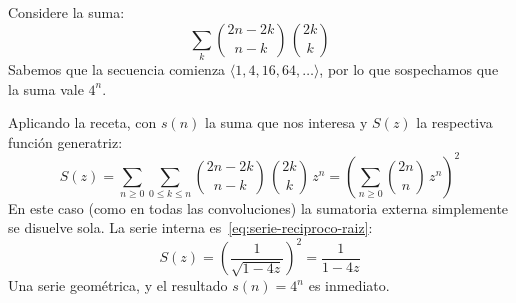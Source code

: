   \begin{example}
    Considere la suma:
    \begin{equation*}
      \sum_k \binom{2 n - 2 k}{n - k} \, \binom{2 k}{k}
    \end{equation*}
    Sabemos que la secuencia
    comienza \(\langle 1, 4, 16, 64, \dotsc\rangle\),
    por lo que sospechamos que la suma vale \(4^n\).

    Aplicando la receta,
    con \(s(n)\) la suma que nos interesa
    y \(S(z)\) la respectiva función generatriz:
    \begin{equation*}
      S(z)
	= \sum_{n \ge 0}
	    \sum_{0 \le k \le n}
	      \binom{2 n - 2 k}{n - k} \, \binom{2 k}{k} \, z^n
	= \left( \sum_{n \ge 0} \binom{2 n}{n} \, z^n \right)^2
    \end{equation*}
    En este caso
    (como en todas las convoluciones)
    la sumatoria externa simplemente se disuelve sola.
    La serie interna es~\eqref{eq:serie-reciproco-raiz}:
    \begin{equation*}
      S(z)
	= \left( \frac{1}{\sqrt{1 - 4 z}} \right)^2
	= \frac{1}{1 - 4 z}
    \end{equation*}
    Una serie geométrica,
    y el resultado \(s(n) = 4^n\) es inmediato.
  \end{example}
